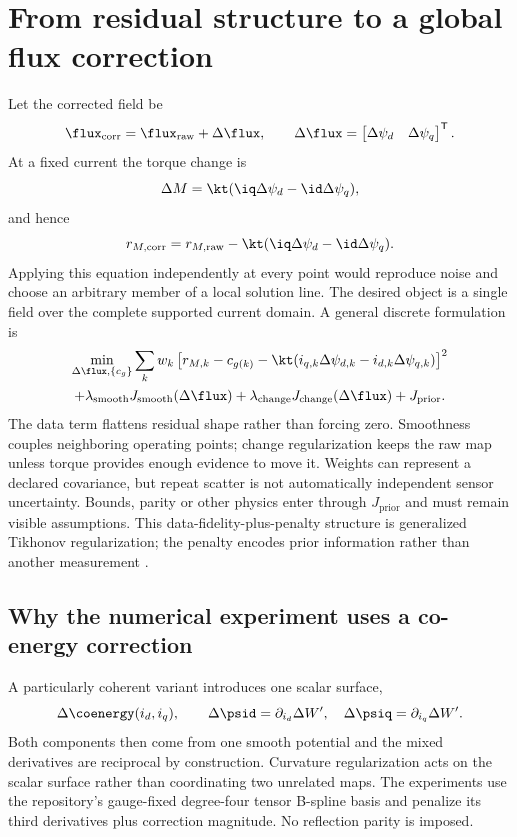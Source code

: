 \section{From residual structure to a global flux correction}
\label{sec:global-regularization}
Let the corrected field be
\begin{equation}
 \flux_{\mathrm{corr}}=\flux_{\mathrm{raw}}+\Delta\flux,
 \qquad \Delta\flux=\begin{bmatrix}\Delta\psi_d&\Delta\psi_q\end{bmatrix}^{\mathsf T}.
\end{equation}
At a fixed current the torque change is
\begin{equation}
 \Delta M=\kt(\iq\Delta\psi_d-\id\Delta\psi_q),
\end{equation}
and hence
\begin{equation}
 r_{M,\mathrm{corr}}=r_{M,\mathrm{raw}}
 -\kt(\iq\Delta\psi_d-\id\Delta\psi_q).
 \label{eq:corrected-residual}
\end{equation}
Applying this equation independently at every point would reproduce noise and
choose an arbitrary member of a local solution line. The desired object is a
single field over the complete supported current domain. A general discrete
formulation is
\begin{multline}
 \min_{\Delta\flux,\{c_g\}}
 \sum_k w_k\left[r_{M,k}-c_{g(k)}
 -\kt(i_{q,k}\Delta\psi_{d,k}-i_{d,k}\Delta\psi_{q,k})\right]^2\\
 +\lambda_{\mathrm{smooth}}J_{\mathrm{smooth}}(\Delta\flux)
 +\lambda_{\mathrm{change}}J_{\mathrm{change}}(\Delta\flux)
 +J_{\mathrm{prior}}.
 \label{eq:global-objective}
\end{multline}
The data term flattens residual shape rather than forcing zero. Smoothness
couples neighboring operating points; change regularization keeps the raw map
unless torque provides enough evidence to move it. Weights can represent a
declared covariance, but repeat scatter is not automatically independent sensor
uncertainty. Bounds, parity or other physics enter through $J_{\mathrm{prior}}$
and must remain visible assumptions.
This data-fidelity-plus-penalty structure is generalized Tikhonov
regularization; the penalty encodes prior information rather than another
measurement \cite{hohage2020inverse}.

\subsection{Why the numerical experiment uses a co-energy correction}
A particularly coherent variant introduces one scalar surface,
\begin{equation}
 \Delta\coenergy(i_d,i_q),\qquad
 \Delta\psid=\partial_{i_d}\Delta W',\quad
 \Delta\psiq=\partial_{i_q}\Delta W'.
 \label{eq:coenergy-correction}
\end{equation}
Both components then come from one smooth potential and the mixed derivatives
are reciprocal by construction. Curvature regularization acts on the scalar
surface rather than coordinating two unrelated maps. The experiments use the
repository's gauge-fixed degree-four tensor B-spline basis and penalize its
third derivatives plus correction magnitude. No reflection parity is imposed.

